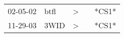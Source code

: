 \begin{supertabular}{p{0.07\textwidth}p{0.06\textwidth}p{0.02\textwidth}p{0.02\textwidth}p{0.06\textwidth}}
 02-05-02\textsuperscript{} &  btfl\textsuperscript{} &  \textgreater &   &  *CS1* \\
 11-29-03\textsuperscript{} &  3WID\textsuperscript{} &  \textgreater &   &  *CS1* \\
\end{supertabular}
